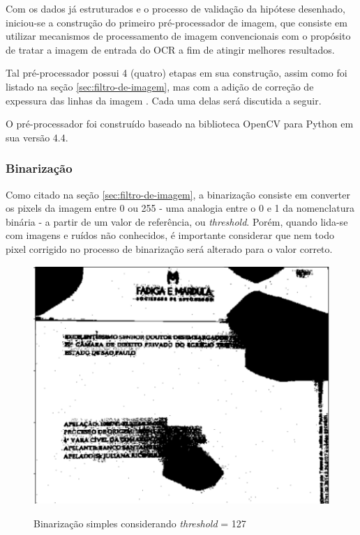 Com os dados já estruturados e o processo de validação da hipótese desenhado, iniciou-se a construção do primeiro pré-processador de imagem, que consiste em utilizar mecanismos de processamento de imagem convencionais com o propósito de tratar a imagem de entrada do OCR a fim de atingir melhores resultados.

Tal pré-processador possui 4 (quatro) etapas em sua construção, assim como foi listado na seção \ref{sec:filtro-de-imagem}, mas com a adição de correção de expessura das linhas da imagem \cite{K3M-image-skeletonization}. Cada uma delas será discutida a seguir.

O pré-processador foi construído baseado na biblioteca OpenCV para Python em sua versão 4.4.

\subsubsection{Binarização} \label{sssec:binarization}

Como citado na seção \ref{sec:filtro-de-imagem}, a binarização consiste em converter os pixels da imagem entre 0 ou 255 - uma analogia entre o 0 e 1 da nomenclatura binária - a partir de um valor de referência, ou \textit{threshold}. Porém, quando lida-se com imagens e ruídos não conhecidos, é importante considerar que nem todo pixel corrigido no processo de binarização será alterado para o valor correto.

\begin{figure}[H]
  \centering
  \caption{Binarização simples considerando \textit{threshold} = 127}
  \includegraphics[scale=.7]{figuras/binarizacao-simples.png}
  \label{fig:binarizacao-simples}
\end{figure}

